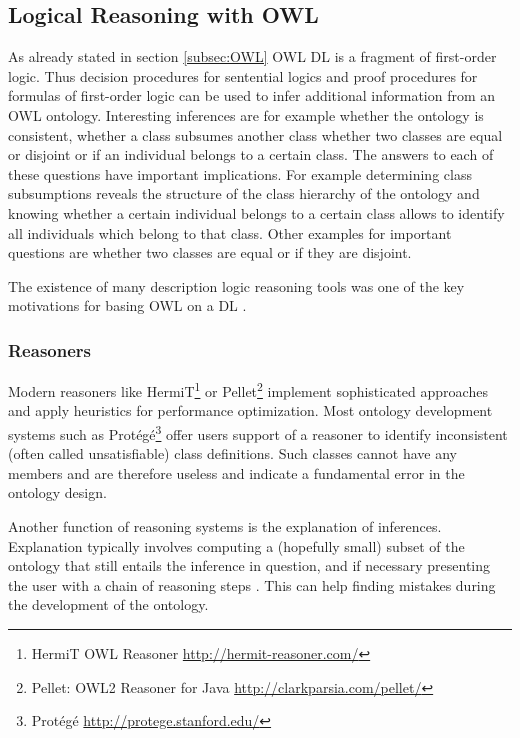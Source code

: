 \subsection{Logical Reasoning with OWL}
As already stated in section \ref{subsec:OWL} OWL DL is a fragment of first-order logic.
Thus decision procedures for sentential logics and proof procedures for
formulas of first-order logic can be used to infer additional information from
an OWL ontology.
Interesting inferences are for example whether the ontology is consistent,
whether a class subsumes another class whether two classes are equal
or disjoint or if an individual belongs to a certain class.
The answers to each of these questions have important implications. For example
determining class subsumptions reveals the structure of the class hierarchy
of the ontology and knowing whether a certain individual belongs to a certain class
allows to identify all individuals which belong to that class. Other examples
for important questions are whether two classes are equal or if they are disjoint.

The existence of many description logic reasoning tools was one of the
key motivations for basing OWL on a DL \cite{horrocks2008}.

\subsubsection{Reasoners}
Modern reasoners like HermiT\footnote{HermiT OWL Reasoner \url{http://hermit-reasoner.com/}}
or Pellet\footnote{Pellet: OWL2 Reasoner for Java \url{http://clarkparsia.com/pellet/}}
implement sophisticated approaches and apply heuristics for performance optimization.
Most ontology development systems such as Protégé\footnote{Protégé \url{http://protege.stanford.edu/}}
offer users support of a reasoner to identify inconsistent (often called unsatisfiable)
class definitions. Such classes cannot have any members and are therefore useless
and indicate a fundamental error in the ontology design.

Another function of reasoning systems is the explanation of inferences.
Explanation typically involves computing a (hopefully small) subset of the ontology
that still entails the inference in question, and if necessary presenting the user with
a chain of reasoning steps \cite{kalyanpur2005}. This can help finding mistakes
during the development of the ontology.

